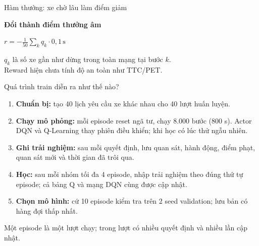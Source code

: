 \documentclass[aspectratio=169,10pt]{beamer}
\begin{document}
  \begin{frame}{Hàm thưởng: xe chờ lâu làm điểm giảm}
    \relax
    \begin{center}
    \end{center}
    \vspace{.25cm}
    \begin{center}
      \colorbox{wash}{\parbox{.72\linewidth}{\centering\vspace{.15cm}
        \textbf{Đổi thành điểm thưởng âm}\par\vspace{.1cm}
        {\Large $\displaystyle r=-\frac{1}{50}\sum_k q_k\cdot0,1\,\mathrm{s}$}\par\vspace{.15cm}}}
    \end{center}
    \vspace{.15cm}
    \begin{center}
      \small $q_k$ là số xe gần như dừng trong toàn mạng tại bước $k$.\\[.1cm]
      Reward hiện chưa tính độ an toàn như TTC/PET.
    \end{center}
  \end{frame}
  \begin{frame}{Quá trình train diễn ra như thế nào?}
    \relax
    \begin{enumerate}
      \item \textbf{Chuẩn bị:} tạo 40 lịch yêu cầu xe khác nhau cho 40 lượt huấn luyện.
      \item \textbf{Chạy mô phỏng:} mỗi episode reset ngã tư, chạy 8.000 bước (800 s). Actor DQN và Q-Learning thay phiên điều khiển; khi học có lúc thử ngẫu nhiên.
      \item \textbf{Ghi trải nghiệm:} sau mỗi quyết định, lưu quan sát, hành động, điểm phạt, quan sát mới và thời gian đã trôi qua.
      \item \textbf{Học:} sau mỗi nhóm tối đa 4 episode, nhập trải nghiệm theo đúng thứ tự episode; cả bảng Q và mạng DQN cùng được cập nhật.
      \item \textbf{Chọn mô hình:} cứ 10 episode kiểm tra trên 2 seed validation; lưu bản có hàng đợi thấp nhất.
    \end{enumerate}
    \vspace{.15cm}
    \small Một episode là một lượt chạy; trong lượt có nhiều quyết định và nhiều lần cập nhật.
  \end{frame}
\end{document}
